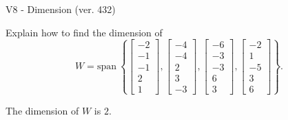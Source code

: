 \begin{exercise}
  \begin{exerciseTitle}V8 - Dimension (ver. 432)\end{exerciseTitle}
  \begin{exerciseStatement}
    Explain how to find the dimension of 
\[W=\mathrm{span}\ \left\{\left[\begin{array}{r}
-2 \\
-1 \\
-1 \\
2 \\
1
\end{array}\right] , \left[\begin{array}{r}
-4 \\
-4 \\
2 \\
3 \\
-3
\end{array}\right] , \left[\begin{array}{r}
-6 \\
-3 \\
-3 \\
6 \\
3
\end{array}\right] , \left[\begin{array}{r}
-2 \\
1 \\
-5 \\
3 \\
6
\end{array}\right]\right\}.\]



  \end{exerciseStatement}
  \begin{exerciseAnswer}
   The dimension of \(W\) is  \(2\).
  


  \end{exerciseAnswer}
\end{exercise}